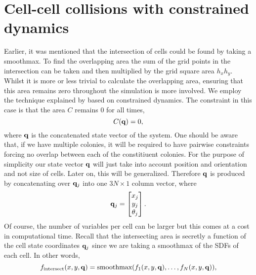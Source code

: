 \section{Cell-cell collisions with constrained dynamics} \label{collisionModel}
Earlier, it was mentioned that the intersection of cells could be found by taking a smoothmax. To find the overlapping area
the sum of the grid points in the intersection can be taken and then multiplied by the grid square area $h_x h_y$. Whilst
it is more or less trivial to calculate the overlapping area, ensuring that this area remains zero throughout the simulation
is more involved. We employ the technique explained by \cite{witkin1997introduction} based on constrained
dynamics. The constraint in this case is that the area $C$ remains $0$ for all times,
\begin{equation}
    C(\vb{q}) = 0,
\end{equation}
where $\vb{q}$ is the concatenated state vector of the system. One should be aware that, if we have multiple colonies, it will
be required to have pairwise constraints forcing no overlap between each of the constitiuent colonies. For the purpose of simplicity
our state vector $\vb{q}$ will just take into account position and orientation and not size of cells. Later on, this will be generalized.
Therefore $\vb{q}$ is produced by concatenating over $\vb{q}_j$ into one $3N \times 1$ column vector, where
\begin{equation}
\vb{q}_j = \begin{bmatrix}
                x_j \\
                y_j \\
                \theta_j
            \end{bmatrix}.
\end{equation}
Of course, the number of variables per cell can be larger but this comes at a cost in computational time. Recall that the 
intersecting area is secretly a function of the cell state coordinates $\vb{q}_j$ since we are taking a smoothmax of the SDFs 
of each cell. In other words,
\begin{equation*}
f_{\textrm{intersect}}(x,y,\vb{q}) = \textrm{smoothmax}(f_1(x,y,\vb{q}) , \ldots, f_N(x,y,\vb{q}) ),
\end{equation*}

